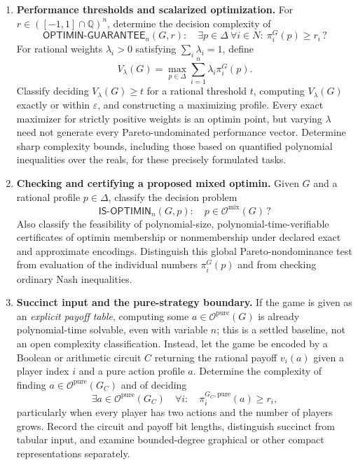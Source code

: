 \documentclass[11pt,a4paper]{article}
\begin{document}
\begin{enumerate}[label=\textbf{(\Alph*)},leftmargin=2.7em]
\item \textbf{Performance thresholds and scalarized optimization.}
For $r\in([-1,1]\cap\mathbb Q)^n$, determine the decision complexity of
\[
\mathsf{OPTIMIN\text{-}GUARANTEE}_n(G,r):\quad
\exists p\in\Delta\ \forall i\in N:\ \pi_i^G(p)\ge r_i\,?
\]
For rational weights $\lambda_i>0$ satisfying $\sum_i\lambda_i=1$, define
\[
V_\lambda(G)=\max_{p\in\Delta}\sum_{i=1}^n\lambda_i\pi_i^G(p).
\]
Classify deciding $V_\lambda(G)\ge t$ for a rational threshold $t$, computing $V_\lambda(G)$ exactly or within $\varepsilon$, and constructing a maximizing profile. Every exact maximizer for strictly positive weights is an optimin point, but varying $\lambda$ need not generate every Pareto-undominated performance vector. Determine sharp complexity bounds, including those based on quantified polynomial inequalities over the reals, for these precisely formulated tasks.

\item \textbf{Checking and certifying a proposed mixed optimin.}
Given $G$ and a rational profile $p\in\Delta$, classify the decision problem
\[
\mathsf{IS\text{-}OPTIMIN}_n(G,p):\quad p\in\mathcal O^{\mathrm{mix}}(G)\,?
\]
Also classify the feasibility of polynomial-size, polynomial-time-verifiable certificates of optimin membership or nonmembership under declared exact and approximate encodings. Distinguish this global Pareto-nondominance test from evaluation of the individual numbers $\pi_i^G(p)$ and from checking ordinary Nash inequalities.

\item \textbf{Succinct input and the pure-strategy boundary.}
If the game is given as an \emph{explicit payoff table}, computing some $a\in\mathcal O^{\mathrm{pure}}(G)$ is already polynomial-time solvable, even with variable $n$; this is a settled baseline, not an open complexity classification. Instead, let the game be encoded by a Boolean or arithmetic circuit $C$ returning the rational payoff $v_i(a)$ given a player index $i$ and a pure action profile $a$. Determine the complexity of finding $a\in\mathcal O^{\mathrm{pure}}(G_C)$ and of deciding
\[
\exists a\in\mathcal O^{\mathrm{pure}}(G_C)
\quad\forall i:\quad \pi_i^{G_C,\mathrm{pure}}(a)\ge r_i,
\]
particularly when every player has two actions and the number of players grows. Record the circuit and payoff bit lengths, distinguish succinct from tabular input, and examine bounded-degree graphical or other compact representations separately.


\end{enumerate}
\end{document}
